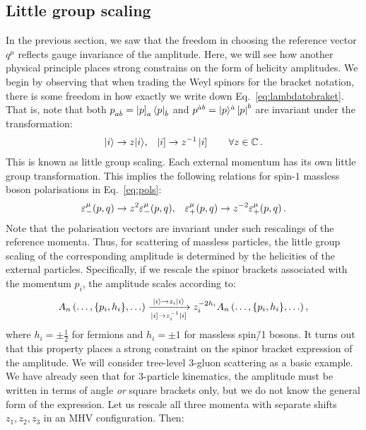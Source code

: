 \documentclass[main.tex]{subfiles}
\begin{document}
\subsection{Little group scaling} \label{sec:littlegroup}
In the previous section, we saw that the freedom in choosing the reference vector $q^\mu$ reflects gauge invariance of the amplitude. Here, we will see how another physical principle places strong constrains on the form of helicity amplitudes. We begin by observing that when trading the Weyl spinors for the bracket notation, there is some freedom in how exactly we write down Eq.~\ref{eq:lambdatobraket}. That is, note that both $p_{a\dot{b}} = \left| p \right]_a \langle p|_{\dot{b}}$ and $p^{\dot{a}b} = |p \rangle^{\dot{a}} \left[ p \right|^b$ are invariant under the transformation:
\begin{align} \label{eq:littlegroupscaling}
    |i \rangle \rightarrow z |i \rangle, && \left| i \right] \rightarrow z^{-1} \left| i \right] \qquad \forall z \in \mathbb{C}\,.  
\end{align}
This is known as little group scaling. Each external momentum has its own little group transformation. This implies the following relations for spin-$1$ massless boson polarisations in Eq.~\ref{eq:pols}:
\begin{align}
    \varepsilon^\mu_- (p,q) \rightarrow z^2 \varepsilon^\mu_- (p,q), &&  \varepsilon^\mu_+ (p,q) \rightarrow z^{-2} \varepsilon^\mu_+ (p,q) \,.
\end{align}
Note that the polarisation vectors are invariant under such rescalings of the reference momenta. Thus, for scattering of massless particles, the little group scaling of the corresponding amplitude is determined by the helicities of the external particles. Specifically, if we rescale the spinor brackets associated with the momentum $p_i$, the amplitude scales according to:
\begin{equation}
    A_n \left(\ldots, \{p_i, h_i\}, \ldots \right) \xrightarrow[\ketsq{i} \rightarrow z_i^{-1}\ketsq{i}]{\ket{i} \rightarrow z_i\ket{i}} z_i^{-2h_i}  A_n \left(\ldots, \{p_i, h_i\}, \ldots \right),
\end{equation}
where $h_i=\pm\frac{1}{2}$ for fermions and $h_i=\pm1$ for massless spin\=/1 bosons. It turns out that this property places a strong constraint on the spinor bracket expression of the amplitude. We will consider tree-level 3-gluon scattering as a basic example. We have already seen that for 3-particle kinematics, the amplitude must be written in terms of angle \textit{or} square brackets only, but we do not know the general form of the expression. Let us rescale all three momenta with separate shifts $z_1, z_2, z_3$ in an MHV configuration. Then:
\end{document}
